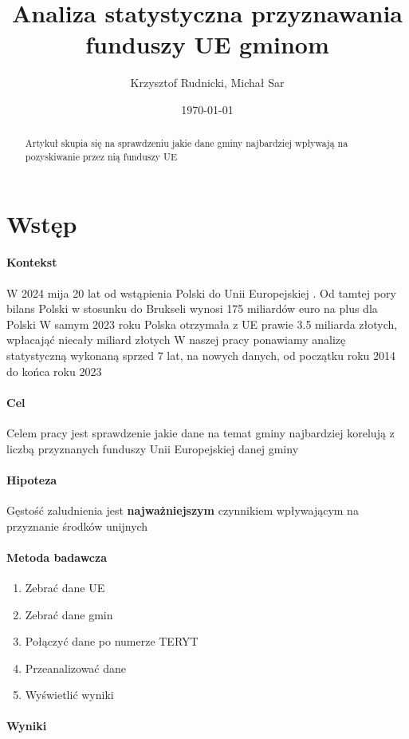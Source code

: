 \documentclass[12pt]{article}
\title{Analiza statystyczna przyznawania funduszy UE gminom}
\author{Krzysztof Rudnicki, Michał Sar}
\date{\today}
\begin{document}
\maketitle

\tableofcontents

\begin{abstract}
    Artykuł skupia się na sprawdzeniu jakie dane gminy najbardziej wpływają na pozyskiwanie przez nią funduszy UE
\end{abstract}


\section{Wstęp}
\paragraph{Kontekst}
W 2024 mija 20 lat od wstąpienia Polski do Unii Europejskiej \cite{1} . 
Od tamtej pory bilans Polski w stosunku do Brukseli wynosi 175 miliardów euro na 
plus dla Polski \cite{2} W samym 2023 roku Polska otrzymała z UE prawie 3.5 miliarda 
złotych, wpłacająć niecały miliard złotych \cite{3} W naszej pracy ponawiamy analizę 
statystyczną wykonaną sprzed 7 lat, na nowych danych, od początku roku 2014 do końca 
roku 2023
\paragraph{Cel}
Celem pracy jest sprawdzenie jakie dane na temat gminy najbardziej korelują z liczbą 
przyznanych funduszy Unii Europejskiej danej gminy
\paragraph{Hipoteza} 
Gęstość zaludnienia jest \textbf{najważniejszym} czynnikiem wpływającym na 
przyznanie środków unijnych
\paragraph{Metoda badawcza}
\begin{enumerate}
    \item Zebrać dane UE
    \item Zebrać dane gmin
    \item Połączyć dane po numerze TERYT
    \item Przeanalizować dane 
    \item Wyświetlić wyniki
\end{enumerate}
\paragraph{Wyniki}
\end{document}

